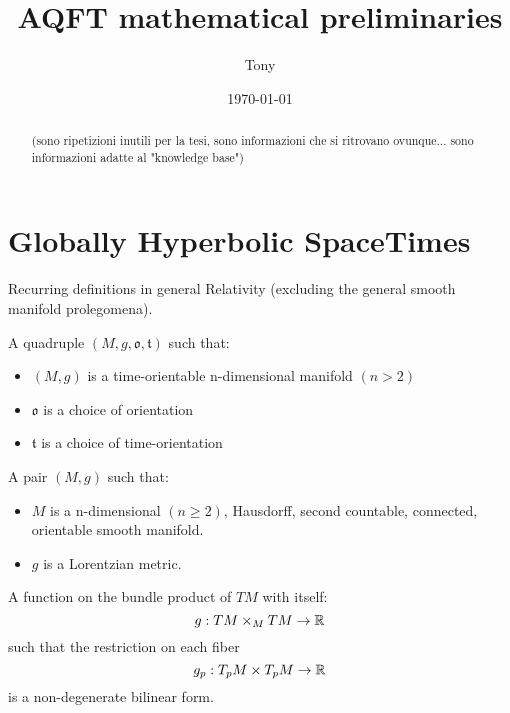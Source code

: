 \documentclass[a4paper,12pt]{scrartcl}    %
\begin{document}
	\title{AQFT mathematical preliminaries}
	\author{Tony}
	\date{\today}
\maketitle

\tableofcontents

\begin{abstract}
		(sono ripetizioni inutili per la tesi, sono informazioni che si ritrovano ovunque... sono informazioni adatte al "knowledge base")
\end{abstract}

\newpage
\section{Globally Hyperbolic SpaceTimes}
	Recurring definitions in general Relativity (excluding the general smooth manifold prolegomena).

	\begin{definition}
		A quadruple $(M, g, \mathfrak{o}, \mathfrak{t})$ such that:
		\begin{itemize}
			\item $(M,g)$ is a time-orientable n-dimensional manifold $(n>2)$
			\item $\mathfrak{o}$ is a choice of orientation
			\item $\mathfrak{t}$ is a choice of time-orientation
		\end{itemize}
	\end{definition}

	\begin{definition}
		A pair $(M, g)$ such that:
		\begin{itemize}
			\item $M$ is a n-dimensional $(n\geq2)$, Hausdorff, second countable, connected, orientable smooth manifold.
			\item $g$ is a Lorentzian metric.
		\end{itemize}
	\end{definition}
			
	\begin{definition}[Metric]
		A function on the bundle product of $TM$ with itself: $$g: TM \times_M TM \rightarrow \mathbb{R}$$ such that the restriction on each fiber $$g_p: T_pM \times T_pM \rightarrow \mathbb{R} $$ is a non-degenerate bilinear form.
	\end{definition}
	
\end{document}
